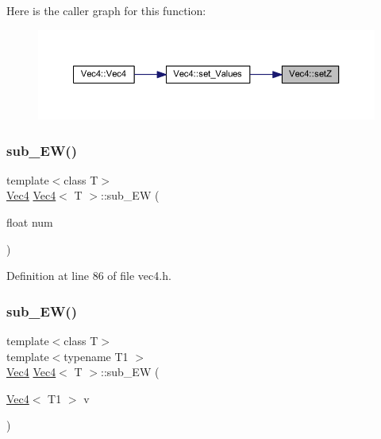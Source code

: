 Here is the caller graph for this function\+:
\nopagebreak
\begin{figure}[H]
\begin{center}
\leavevmode
\includegraphics[width=350pt]{class_vec4_aaa54409c9cea008742d4fd28a8a1b8d9_icgraph}
\end{center}
\end{figure}
\mbox{\label{class_vec4_a62f7104ab1c2585bda2ebc1ef20b4a91}} 
\subsubsection{\texorpdfstring{sub\_EW()}{sub\_EW()}\hspace{0.1cm}{\footnotesize\ttfamily [1/2]}}
{\footnotesize\ttfamily template$<$class T$>$ \\
\mbox{\hyperlink{class_vec4}{Vec4}} \mbox{\hyperlink{class_vec4}{Vec4}}$<$ T $>$\+::sub\+\_\+\+EW (\begin{DoxyParamCaption}\item[{float}]{num }\end{DoxyParamCaption})\hspace{0.3cm}{\ttfamily [inline]}}



Definition at line 86 of file vec4.\+h.

\mbox{\label{class_vec4_a940a406db252f6d638926599ed35dc1a}} 
\subsubsection{\texorpdfstring{sub\_EW()}{sub\_EW()}\hspace{0.1cm}{\footnotesize\ttfamily [2/2]}}
{\footnotesize\ttfamily template$<$class T$>$ \\
template$<$typename T1 $>$ \\
\mbox{\hyperlink{class_vec4}{Vec4}} \mbox{\hyperlink{class_vec4}{Vec4}}$<$ T $>$\+::sub\+\_\+\+EW (\begin{DoxyParamCaption}\item[{\mbox{\hyperlink{class_vec4}{Vec4}}$<$ T1 $>$}]{v }\end{DoxyParamCaption})\hspace{0.3cm}{\ttfamily [inline]}}



